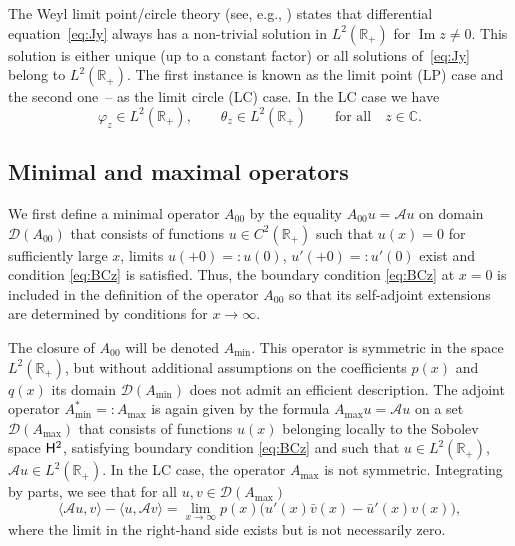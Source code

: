 \documentclass[pdftex]{sigma}%
\numberwithin{equation}{section}
\begin{document}
The Weyl limit point/circle theory (see, e.g., \cite[Chapter~IX]{CoLe}) states that dif\-fe\-ren\-tial equation~\eqref{eq:Jy} always has a non-trivial solution in $L^2 ({\mathbb R}_{+})$ for $\operatorname{Im} z \neq 0$. This solution is either unique (up to a constant factor) or all solutions of~\eqref{eq:Jy} belong to $L^2 ({\mathbb R}_{+})$.
The first instance is known as the limit point (LP) case and the second one~-- as the limit circle (LC) case.
In the LC case we have
 \begin{equation}
\varphi_{z}\in L^2 ({\mathbb R}_{+}),\qquad \theta_{z}\in L^2 ({\mathbb R}_{+})\qquad \mbox{for all}\quad z\in {\mathbb C}.
 \label{eq:PQz}\end{equation}

\subsection{Minimal and maximal operators}\label{section2.2}

 We first define a minimal
 operator $A_{00}$ by the equality $A_{00} u= {\mathcal A} u$ on domain
 $ {\mathcal D} (A_{00}) $ that consists of functions $u\in C ^2 ({\mathbb R}_{+}) $ such that $u(x)=0$ for sufficiently large $x$, limits $u(+0)=: u(0)$, $u'(+0)=: u'(0)$ exist and condition \eqref{eq:BCz} is satisfied.
 Thus, the boundary condition \eqref{eq:BCz} at $x=0$ is included in the definition of the operator $A_{00}$ so that its self-adjoint extensions are determined by conditions for $x\to\infty$.

The closure of $A_{00}$ will be denoted $A_{\min} $. This operator is
symmetric in the space $L^2 ({\mathbb R}_{+})$, but without additional assumptions on the coefficients $p(x)$ and $q(x)$ its domain $ {\mathcal D} (A_{\min}) $ does not admit an efficient description. The adjoint operator $A^*_{\min} =: A_{\max}$ is again given by the formula $A_{\max} u={\mathcal A} u$ on a set $ {\mathcal D} (A_{\max})$ that consists of functions
$u(x)$ belonging locally to the Sobolev space ${\sf H}^2$, satisfying boundary condition \eqref{eq:BCz} and such that $u\in L^2 ({\mathbb R}_{+})$, ${\mathcal A} u\in L^2 ({\mathbb R}_{+})$.
In the LC case, the operator $A_{\max}$ is not symmetric. Integrating by parts, we see that
 for all $u, v \in {\mathcal D} (A_{\max})$
 \[
\langle {\mathcal A} u,v \rangle - \langle u, {\mathcal A} v \rangle = \lim_{x\to\infty} p(x) \big(u'(x)\bar{v} (x)- \bar{u}' (x) v(x)\big),
\]
where the limit in the right-hand side exists but is not necessarily zero.
\end{document}
